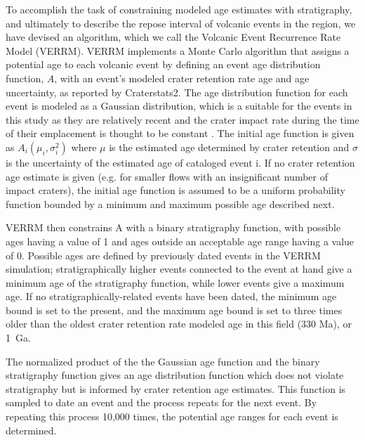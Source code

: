 To accomplish the task of constraining modeled age estimates with stratigraphy, and ultimately to describe the repose interval of volcanic events in the region, we have devised an algorithm, which we call the Volcanic Event Recurrence Rate Model (VERRM). VERRM implements a Monte Carlo algorithm that assigns a potential age to each volcanic event by defining an event age distribution function, $A$, with an event's modeled crater retention rate age and age uncertainty, as reported by Craterstats2. The age distribution function for each event is modeled as a Gaussian distribution, which is a suitable for the events in this study as they are relatively recent and the crater impact rate during the time of their emplacement is thought to be constant \citep{vaucher2009volcanic}. The initial age function is given as $A_i(\mu_i,\sigma_i^2)$ where $\mu$ is the estimated age determined by crater retention and $\sigma$ is the uncertainty of the estimated age of cataloged event i. If no crater retention age estimate is given (e.g. for smaller flows with an insignificant number of impact craters), the initial age function is assumed to be a uniform probability function bounded by a minimum and maximum possible age described next.

VERRM then constrains A with a binary stratigraphy function, with possible ages having a value of 1 and ages outside an acceptable age range having a value of 0. Possible ages are defined by previously dated events in the VERRM simulation; stratigraphically higher events connected to the event at hand give a minimum age of the stratigraphy function, while lower events give a maximum age. If no stratigraphically-related events have been dated, the minimum age bound is set to the present, and the maximum age bound is set to three times older than the oldest crater retention rate modeled age in this field (330 Ma), or 1~Ga.

The normalized product of the the Gaussian age function and the binary stratigraphy function gives an age distribution function which does not violate stratigraphy but is informed by crater retention age estimates. This function is sampled to date an event and the process repeats for the next event. By repeating this process 10,000 times, the potential age ranges for each event is determined.

